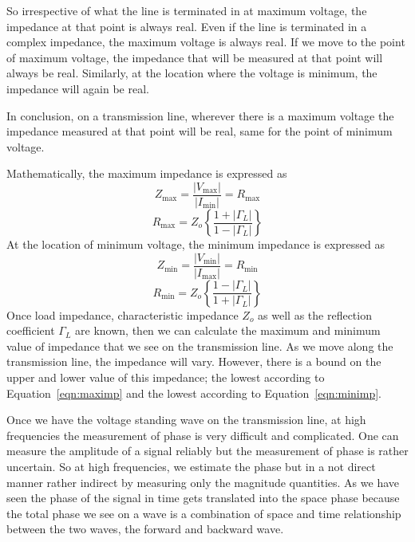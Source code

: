 So irrespective of what the line is terminated in at maximum voltage, the impedance at that point is always real. Even if the line is terminated in a complex impedance, the maximum voltage is always real. If we move to the point of maximum voltage, the impedance that will be measured at that point will always be real. Similarly, at the location where the voltage is minimum, the impedance will again be real.

In conclusion, on a transmission line, wherever there is a maximum voltage the impedance measured at that point will be real, same for the point of minimum voltage.

Mathematically, the maximum impedance is expressed as
\begin{equation}
Z_{\max} = \frac{|V_{\max}|}{|I_{\min}|} = R_{\max}
\label{eqn:maximp}
\end{equation}
\begin{equation}
R_{\max}= Z_o\left\{\frac{1+|\Gamma_L|}{1-|\Gamma_L|}\right\}
\end{equation}
At the location of minimum voltage, the minimum impedance is expressed as
\begin{equation}
Z_{\min}=\frac{|V_{\min}|}{|I_{\max}|} = R_{\min}
\label{eqn:minimp}
\end{equation}
\begin{equation}
R_{\min} =Z_o\left\{\frac{1-|\Gamma_L|}{1+|\Gamma_L|}\right\}
\end{equation}
Once load impedance, characteristic impedance $Z_o$ as well as the reflection coefficient $\Gamma_L$ are known, then we can calculate the maximum and minimum value of impedance that we see on the transmission line. As we move along the transmission line, the impedance will vary. However, there is a bound on the upper and lower value of this impedance; the lowest according to Equation~\ref{eqn:maximp} and the lowest according to Equation~\ref{eqn:minimp}.

Once we have the voltage standing wave on the transmission line, at high frequencies the measurement of phase is very difficult and complicated. One can measure the amplitude of a signal reliably but the measurement of phase is rather uncertain. So at high frequencies, we estimate the phase but in a not direct manner rather indirect by measuring only the magnitude quantities. As we have seen the phase of the signal in time gets translated into the space phase because the total phase we see on a wave is a combination of space and time relationship between the two waves, the forward and backward wave. 

